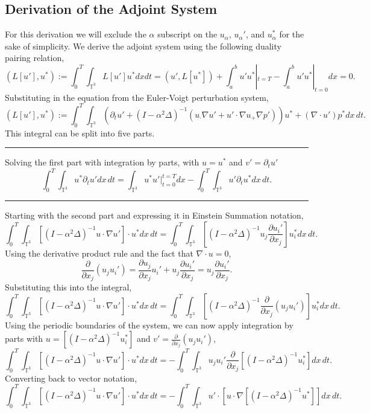 \documentclass[12pt]{article}
\numberwithin{equation}{section}
\begin{document}
\subsection{Derivation of the Adjoint System}\label{app:adjoint}
For this derivation we will exclude the $\alpha$ subscript on the $u_{\alpha}$, $u_{\alpha}'$, and $u_{\alpha}^*$ for the sake of simplicity. We derive the adjoint system using the following duality pairing relation, 
$$(L[u'],u^*):=\int_0^T\int_{\mathbb{T}^3} L[u']u^* dx dt = (u',L[u^*])+\int_a^b u'u^*|_{t=T}-\int_a^b u'u^*|_{t=0} dx = 0.$$
Substituting in the equation from the Euler-Voigt perturbation system,
$$(L[u'],u^*):= \int_0^T\int_{\mathbb{T}^3} (\partial_t u'+(I-\alpha^2\Delta)^{-1}(u_\cdot\nabla u'+u'\cdot\nabla u_+\nabla p'))u^*+(\nabla \cdot u')p^* dx\,dt.$$
This integral can be split into five parts. 
\begin{center}
\noindent\rule{19cm}{0.4pt}
\end{center}
Solving the first part with integration by parts, with $u=u^*$ and $v'=\partial_t u'$
$$\int_0^T\int_{\mathbb{T}^3}u^*\partial_t u'dx\, dt = \int_{\mathbb{T}^3}u^*u'|_{t=0}^{t=T} dx - \int_0^T\int_{\mathbb{T}^3} u'\partial_t u^* dx\, dt.$$
\begin{center}
\noindent\rule{19cm}{0.4pt}
\end{center}
Starting with the second part and expressing it in Einstein Summation notation,
$$\int_0^T\int_{\mathbb{T}^3}\left[(I-\alpha^2\Delta)^{-1}u\cdot\nabla u'\right]\cdot u^* dx\, dt = \int_0^T\int_{\mathbb{T}^3}\left[(I-\alpha^2\Delta)^{-1}u_{j}\frac{\partial u_i'}{\partial x_j}\right]u^*_i dx\, dt.$$
Using the derivative product rule and the fact that $\nabla \cdot u = 0$,
$$\frac{\partial}{\partial x_j}(u_ju_i') = \frac{\partial u_j}{\partial x_j}u_i' + u_j\frac{\partial u_i'}{\partial x_j} = u_j\frac{\partial u_i'}{\partial x_j}.$$
Substituting this into the integral,
$$\int_0^T\int_{\mathbb{T}^3}\left[(I-\alpha^2\Delta)^{-1}u\cdot\nabla u'\right]\cdot u^* dx\, dt = \int_0^T\int_{\mathbb{T}^3}\left[(I-\alpha^2\Delta)^{-1} \frac{\partial}{\partial x_j}(u_j u_i') \right]u^*_i dx \,dt.$$
Using the periodic boundaries of the system, we can now apply integration by parts with $u=[(I-\alpha^2\Delta)^{-1}u_i^*]$ and $v'= \frac{\partial}{\partial x_j}(u_j u_i')$,
$$\int_0^T\int_{\mathbb{T}^3}\left[(I-\alpha^2\Delta)^{-1}u\cdot\nabla u'\right]\cdot u^* dx\, dt = -\int_0^T\int_{\mathbb{T}^3} u_j u_i' \frac{\partial}{\partial x_j}\left[(I-\alpha^2\Delta)^{-1}u^*_i \right] dx \,dt.$$
Converting back to vector notation,
$$\int_0^T\int_{\mathbb{T}^3}\left[(I-\alpha^2\Delta)^{-1}u\cdot\nabla u'\right]\cdot u^* dx\, dt = -\int_0^T\int_{\mathbb{T}^3} u' \cdot \left[u \cdot \nabla\left[(I-\alpha^2\Delta)^{-1}u^* \right]\right] dx \,dt.$$
\end{document}
